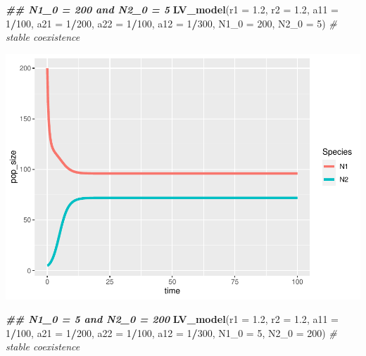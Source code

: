 \documentclass[
]{book}
\newenvironment{Shaded}{\begin{snugshade}}{\end{snugshade}}
\newcommand{\AttributeTok}[1]{\textcolor[rgb]{0.13,0.29,0.53}{#1}}
\newcommand{\CommentTok}[1]{\textcolor[rgb]{0.56,0.35,0.01}{\textit{#1}}}
\newcommand{\DecValTok}[1]{\textcolor[rgb]{0.00,0.00,0.81}{#1}}
\newcommand{\DocumentationTok}[1]{\textcolor[rgb]{0.56,0.35,0.01}{\textbf{\textit{#1}}}}
\newcommand{\FloatTok}[1]{\textcolor[rgb]{0.00,0.00,0.81}{#1}}
\newcommand{\FunctionTok}[1]{\textcolor[rgb]{0.13,0.29,0.53}{\textbf{#1}}}
\newcommand{\NormalTok}[1]{#1}
\newcommand{\SpecialCharTok}[1]{\textcolor[rgb]{0.81,0.36,0.00}{\textbf{#1}}}
\begin{document}
\begin{Shaded}
\begin{Highlighting}[]
  \DocumentationTok{\#\# N1\_0 = 200 and N2\_0 = 5}
  \FunctionTok{LV\_model}\NormalTok{(}\AttributeTok{r1 =} \FloatTok{1.2}\NormalTok{, }\AttributeTok{r2 =} \FloatTok{1.2}\NormalTok{, }\AttributeTok{a11 =} \DecValTok{1}\SpecialCharTok{/}\DecValTok{100}\NormalTok{, }\AttributeTok{a21 =} \DecValTok{1}\SpecialCharTok{/}\DecValTok{200}\NormalTok{, }\AttributeTok{a22 =} \DecValTok{1}\SpecialCharTok{/}\DecValTok{100}\NormalTok{, }\AttributeTok{a12 =} \DecValTok{1}\SpecialCharTok{/}\DecValTok{300}\NormalTok{, }\AttributeTok{N1\_0 =} \DecValTok{200}\NormalTok{, }\AttributeTok{N2\_0 =} \DecValTok{5}\NormalTok{)  }\CommentTok{\# stable coexistence}
\end{Highlighting}
\end{Shaded}

\includegraphics{bookdown-demo_files/figure-latex/unnamed-chunk-21-5.pdf}

\begin{Shaded}
\begin{Highlighting}[]
  \DocumentationTok{\#\# N1\_0 = 5 and N2\_0 = 200}
  \FunctionTok{LV\_model}\NormalTok{(}\AttributeTok{r1 =} \FloatTok{1.2}\NormalTok{, }\AttributeTok{r2 =} \FloatTok{1.2}\NormalTok{, }\AttributeTok{a11 =} \DecValTok{1}\SpecialCharTok{/}\DecValTok{100}\NormalTok{, }\AttributeTok{a21 =} \DecValTok{1}\SpecialCharTok{/}\DecValTok{200}\NormalTok{, }\AttributeTok{a22 =} \DecValTok{1}\SpecialCharTok{/}\DecValTok{100}\NormalTok{, }\AttributeTok{a12 =} \DecValTok{1}\SpecialCharTok{/}\DecValTok{300}\NormalTok{, }\AttributeTok{N1\_0 =} \DecValTok{5}\NormalTok{, }\AttributeTok{N2\_0 =} \DecValTok{200}\NormalTok{)  }\CommentTok{\# stable coexistence}
\end{Highlighting}
\end{Shaded}
\end{document}
